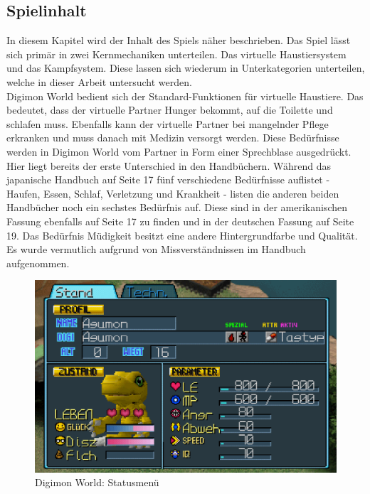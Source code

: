 \subsection{Spielinhalt}\label{sec:game-content}
In diesem Kapitel wird der Inhalt des Spiels näher beschrieben. Das Spiel lässt sich primär in zwei Kernmechaniken unterteilen. Das virtuelle Haustiersystem und das Kampfsystem. Diese lassen sich wiederum in Unterkategorien unterteilen, welche in dieser Arbeit untersucht werden.\\

Digimon World bedient sich der Standard-Funktionen für virtuelle Haustiere. Das bedeutet, dass der virtuelle Partner Hunger bekommt, auf die Toilette und schlafen muss. Ebenfalls kann der virtuelle Partner bei mangelnder Pflege erkranken und muss danach mit Medizin versorgt werden.
Diese Bedürfnisse werden in Digimon World vom Partner in Form einer Sprechblase ausgedrückt. Hier liegt bereits der erste Unterschied in den Handbüchern. Während das japanische Handbuch auf Seite 17 fünf verschiedene Bedürfnisse auflistet - Haufen, Essen, Schlaf, Verletzung und Krankheit - listen die anderen beiden Handbücher noch ein sechstes Bedürfnis auf. Diese sind in der amerikanischen Fassung ebenfalls auf Seite 17 zu finden und in der deutschen Fassung auf Seite 19. Das Bedürfnis Müdigkeit besitzt eine andere Hintergrundfarbe und Qualität. Es wurde vermutlich aufgrund von Missverständnissen im Handbuch aufgenommen.\\

\begin{figure}[H]
\begin{center}
\includegraphics[width=0.8\columnwidth]{figures/screenshots/parameter.png}
  \caption{\label{fig:dw1-parameter} Digimon World: Statusmenü}
\end{center}
\end{figure}

